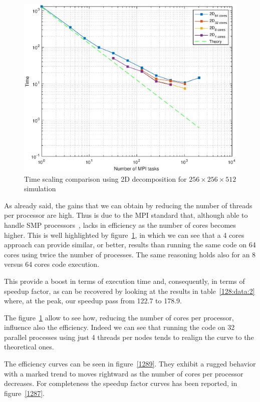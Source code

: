 \begin{figure}
\begin{center}
\includegraphics[scale=0.55]{grafici/1285}
\caption{Time scaling comparison using 2D decomposition for $256\times 256\times 512$  simulation}
\label{1285}
\end{center}
\end{figure}

As already said, the gains that we can obtain by reducing the number of threads per processor are high. 
Thus is due to the MPI standard that, although able to handle SMP processors~\cite{smp:processors}, lacks in efficiency as the number of cores becomes higher.
This is well highlighted by figure~\ref{1285}, in which we can see that a 4 cores approach can provide similar, or better, results than running the same code on 64 cores using twice the number of processes. The same reasoning holds also for an 8 versus 64 cores code execution. \par
This provide a boost in terms of execution time and, consequently, in terms of speedup factor, as can be recovered by looking at the results in table~\ref{128:data:2} where, at the peak, our speedup pass from 122.7 to 178.9.\par
The figure~\ref{1285} allow to see how, reducing the number of cores per processor, influence also the efficiency. Indeed we can see that running the code on 32 parallel processes using just 4 threads per nodes tends to realign the curve to the theoretical ones.\par
The efficiency curves can be seen in figure~\ref{1289}. They exhibit a rugged behavior with a marked trend to moves rightward as the number of cores per processor decreases.
For completeness the speedup factor curves has been reported, in figure~\ref{1287}.


